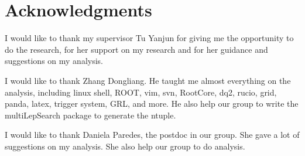 
\chapter*{Acknowledgments}

I would like to thank my supervisor Tu Yanjun for giving me the opportunity to do the research, for her support on my research and for her guidance and suggestions on my analysis.

I would like to thank Zhang Dongliang. He taught me almost everything on the analysis, including linux shell, ROOT, vim, svn, RootCore, dq2, rucio, grid, panda, latex, trigger system, GRL, and more.
He also help our group to write the multiLepSearch package to generate the ntuple.

I would like to thank Daniela Paredes, the postdoc in our group.
She gave a lot of suggestions on my analysis.
She also help our group to do analysis.

